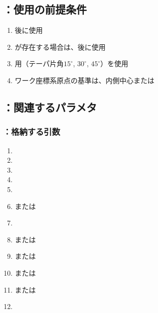 \subsection{\KEndFaceInCChamferRLeft：使用の前提条件}
\begin{enumerate}[label*=\sarrow]
\item \EndFacecutMilling 後に使用
\item \IncutBoring が存在する場合は、\IncutBoringMilling 後に使用
\item \EndFaceCChamferMilling 用\TaperEndMill（テーパ片角$15^\circ$, $30^\circ$, $45^\circ$）を使用
\item {}ワーク座標系原点の基準は、\EndFace 内側中心または\IncutBoringCenter
\end{enumerate}


\subsection{\KEndFaceInCChamferRLeft：関連するパラメタ}

\subsubsection{\KEndFaceInCChamferRLeft：格納する引数}
\begin{enumerate}[label*=\sarrow]
\item \PMIncutBoringExists
\item \PMChamferType
\item \PMIncutBoringACWidth
\item \PMIncutBoringBDWidth
\item \PMPlatingThk
\item \PMTopEndIDCornerR または \PMBottomEndIDCornerR
\item \PMIncutBoringCornerR
\item \PMTopEndFaceInCChamferLength または\PMBottomEndFaceInCChamferLength
\item \PMTopEndFaceInRChamferRadius または\PMBottomEndFaceInRChamferRadius
\item \PMTopReAlocationLength または\PMBottomReAlocationLength
\item \PMTopAlocationLength または\PMBottomAlocationLength
\item \PMCenterCurvatureRadius
\end{enumerate}

